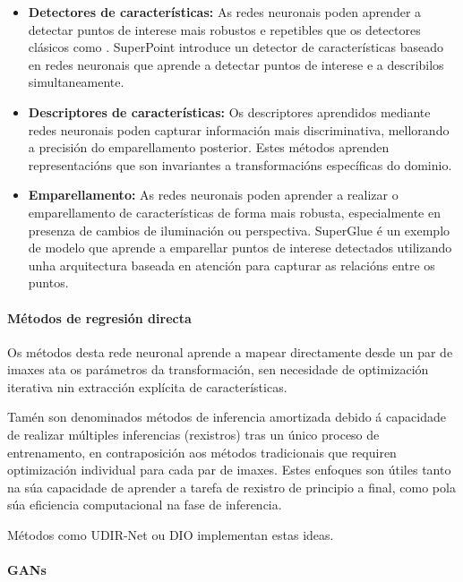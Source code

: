 \begin{itemize}
\item \textbf{Detectores de características:} As redes neuronais poden aprender a detectar puntos de interese mais robustos e repetibles que os detectores clásicos como . SuperPoint \cite{superpoint} introduce un detector de características baseado en redes neuronais que aprende a detectar puntos de interese e a describilos simultaneamente.
\item \textbf{Descriptores de características:} Os descriptores aprendidos mediante redes neuronais poden capturar información mais discriminativa, mellorando a precisión do emparellamento posterior. Estes métodos aprenden representacións que son invariantes a transformacións específicas do dominio.
\item \textbf{Emparellamento:} As redes neuronais poden aprender a realizar o emparellamento de características de forma mais robusta, especialmente en presenza de cambios de iluminación ou perspectiva. SuperGlue \cite{superglue} é un exemplo de modelo que aprende a emparellar puntos de interese detectados utilizando unha arquitectura baseada en atención para capturar as relacións entre os puntos.
\end{itemize}

\paragraph{Métodos de regresión directa}
\label{par:direct_regression}

Os métodos desta rede neuronal aprende a mapear directamente desde un par de imaxes ata os parámetros da transformación, sen necesidade de optimización iterativa nin extracción explícita de características.

Tamén son denominados métodos de inferencia amortizada debido á capacidade de realizar múltiples inferencias (rexistros) tras un único proceso de entrenamento, en contraposición aos métodos tradicionais que requiren optimización individual para cada par de imaxes.
Estes enfoques son útiles tanto na súa capacidade de aprender a tarefa de rexistro de principio a final, como pola súa eficiencia computacional na fase de inferencia.

Métodos como UDIR-Net \cite{undefreg} ou DIO \cite{Jena_2025} implementan estas ideas.

\paragraph{GANs}
\label{par:GANs}

